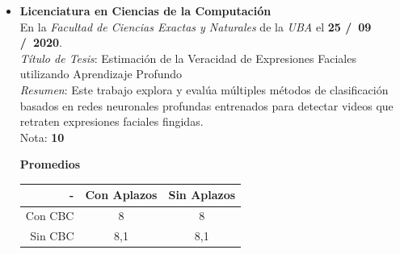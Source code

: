 \begin{itemize}[leftmargin=0.2cm]

  \item {
    \textbf{Licenciatura en Ciencias de la Computación} \\
    En la \emph{Facultad de Ciencias Exactas y Naturales} de la \emph{UBA} el \textbf{25 \slash \ 09 \slash \ 2020}.
    \\ \emph{Título de Tesis}: Estimación de la Veracidad de Expresiones Faciales utilizando Aprendizaje Profundo
    \\ \emph{Resumen}: Este trabajo explora y evalúa múltiples métodos de clasificación basados en redes neuronales profundas entrenados para detectar videos que retraten expresiones faciales fingidas. \\
    Nota: \textbf{10}
    \ifdefined\JTP
    \begin{center}
    \textbf{Promedios}

    \begin{tabular}{|r|c|c|}
    \hline
    - & Con Aplazos & Sin Aplazos \\
    \hline
    Con CBC & 8 & 8 \\
    \hline
    Sin CBC & 8,1 & 8,1 \\
    \hline
    \end{tabular}
    \end{center}
    \fi
  }

\end{itemize}